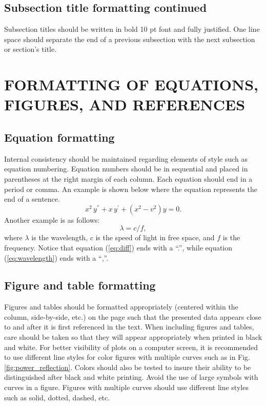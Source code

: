 \documentclass[letterpaper,twocolumn]{ACESJournal}
\newcommand{\red}[1]{{\color{red}#1}}
\begin{document}
\subsection{Subsection title formatting continued}
%
Subsection titles should be written in \red{bold 10 pt font and fully justified}. One line space should separate the end of a previous subsection with the next subsection or section’s title.
%
\section{FORMATTING OF EQUATIONS, FIGURES, AND REFERENCES}
%
\subsection{Equation formatting}
%
Internal consistency should be maintained regarding elements of style such as equation numbering. Equation numbers should be in sequential and placed in parentheses at the right margin of each column. \red{Each equation should end in a period or comma}. An example is shown below where the equation represents the end of a sentence.
%
\begin{equation}
\label{eq:diff}
x^{2} \, y^{''} + x \, y^{'} + \left( x^{2} - v^{2} \right) y = 0.
\end{equation}
%
\red{Another example is as follows:}
%
\begin{equation}
\label{eq:wavelength}
\lambda = c / f,
\end{equation}
%
where $\lambda$ is the wavelength, $c$ is the speed of light in free space, and $f$ is the frequency. Notice that equation (\ref{eq:diff}) ends with a ``.'', while equation (\ref{eq:wavelength}) ends with a ``,''.
%
\subsection{Figure and table formatting}
%
Figures and tables should be formatted appropriately (centered within the column, side-by-side, etc.) on the page such that the presented data appears close to and after it is first referenced in the text. When including figures and tables, care should be taken so that they will appear appropriately when printed in black and white. \red{For better visibility of plots on a computer screen, it is recommended to use different line styles for color figures with multiple curves such as in Fig. \ref{fig:power_reflection}}. Colors should also be tested to insure their ability to be distinguished after black and white printing. \red{Avoid the use of large symbols with curves in a figure}. Figures with multiple curves should use different line styles such as solid, dotted, dashed, etc.
\end{document}
